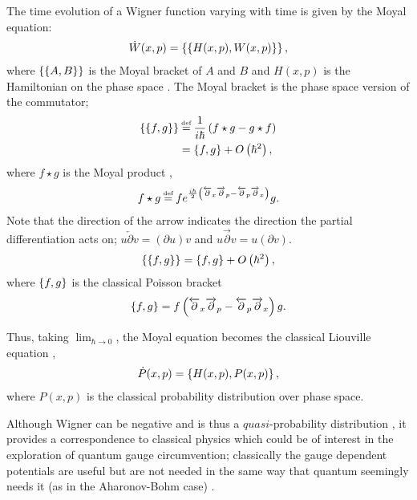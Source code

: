The time evolution of a Wigner function varying with time is given by the Moyal
equation:
\begin{align}
    \dot W(x,p) = \left\{ \left\{ H(x,p), W(x,p) \right\} \right\},
\end{align}
where $\left\{ \left\{ A, B \right\} \right\}$ is the Moyal bracket of $A$ and $B$ and $H(x,p)$ is the
Hamiltonian on the phase space \cite{moyal}. The Moyal bracket is the phase space version of
the commutator;
\begin{align}
    \moyal{f}{g} &\defeq \frac{1}{i \hbar}\left( f \star g - g \star f \right)
    \\
    &= \poiss{f}{g} + O\left(\hbar^2\right),
\end{align}
where $f \star g$ is the Moyal product \cite{moyal},
\begin{align}
    f \star g \defeq fe^{\frac{i \hbar}{2} \left( \overleftarrow \partial_x
        \overrightarrow \partial_p - \overleftarrow \partial_p
        \overrightarrow \partial_x \right)} g.
\end{align}
Note that the direction of the arrow indicates the direction the partial
differentiation acts on; $u \overleftarrow \partial v = \left( \partial u\right)
v$ and $u \overrightarrow \partial v = u \left( \partial v \right)$.
\begin{align}
    \left\{ \left\{ f, g \right\} \right\} = \left\{ f, g \right\} + O \left( \hbar^2 \right),
\end{align}
where $\left\{ f, g \right\}$ is the classical Poisson bracket
\begin{align}
    \left\{ f, g \right\} = f \left( \overleftarrow \partial_x \overrightarrow \partial_p
    - \overleftarrow \partial_p \overrightarrow \partial_x \right)  g.
\end{align}

Thus, taking $\lim_{\hbar \rightarrow 0}$, the Moyal equation becomes the
classical Liouville equation \cite[Page 27]{curtright-fairlie-zachos},
\begin{align}
    \dot P(x,p) = \left\{ H(x,p), P(x,p) \right\},
\end{align}
where $P(x,p)$ is the classical probability distribution over phase space.

Although Wigner can be negative and is thus a $\textit{quasi}$-probability
distribution \cite[Page 8]{curtright-fairlie-zachos}, it provides a correspondence to
classical physics which could be of interest in the exploration of quantum gauge
circumvention; classically the gauge dependent potentials are useful but are not
needed in the same way that quantum seemingly needs it (as in the Aharonov-Bohm
case) \cite{aharonov-bohm}.
